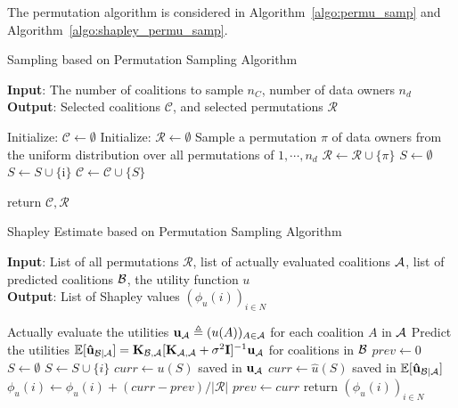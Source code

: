 The permutation algorithm is considered in Algorithm~\ref{algo:permu_samp} and Algorithm~\ref{algo:shapley_permu_samp}. 

\begin{algorithm}[ht]
\caption{Sampling based on Permutation Sampling Algorithm}\label{algo:permu_samp}
\begin{flushleft}
\textbf{Input}: The number of coalitions to sample $n_C$, number of data owners $n_d$\\
\textbf{Output}: Selected coalitions $\mathcal{C}$, and selected permutations $\mathcal{R}$
\end{flushleft}
\begin{algorithmic}[1]
    \STATE Initialize: $\mathcal{C} \gets \emptyset$
    \STATE Initialize: $\mathcal{R} \gets \emptyset$
        \STATE Sample a permutation $\pi$ of data owners from the uniform distribution over all permutations of $1, \cdots, n_d$
        \STATE $\mathcal{R} \gets \mathcal{R} \cup \{\pi\}$
        \STATE $S \gets \emptyset$
            \STATE $S \gets S \cup \{\text{i}\}$
            \STATE $\mathcal{C} \gets \mathcal{C} \cup \{S\}$  
        \ENDFOR
    \ENDWHILE

\STATE return $\mathcal{C}, \mathcal{R}$
\end{algorithmic}
\end{algorithm}

\begin{algorithm}[ht]
\caption{Shapley Estimate based on Permutation Sampling Algorithm}\label{algo:shapley_permu_samp}
\begin{flushleft}
\textbf{Input}: List of all permutations $\mathcal{R}$, list of actually evaluated coalitions $\mathcal{A}$, list of predicted coalitions $\mathcal{B}$, the utility function $u$\\
\textbf{Output}: List of Shapley values $(\phi_u(i))_{i \in N}$
\end{flushleft}
\begin{algorithmic}[1]
    \STATE Actually evaluate the utilities $\mathbf{u}_{\mathcal{A}} \triangleq (u(A))_{A \in \mathcal{A}}$ for each coalition $A$ in $\mathcal{A}$
    \STATE Predict the utilities $ \mathbb{E}[\mathbf{\hat{u}}_{\mathcal{B}|\mathcal{A}}] =
  \mathbf{K}_{\mathcal{B},\mathcal{A}} [\mathbf{K}_{\mathcal{A},\mathcal{A}} + \sigma^2 \mathbf{I}]^{-1} \mathbf{u}_{\mathcal{A}} $ for coalitions in $\mathcal{B}$
        \STATE $prev \gets 0$
        \STATE $S \gets \emptyset$ %
            \STATE $S \gets S \cup \{i\}$ %
            \STATE $curr \gets u(S)$ saved in $\mathbf{u}_{\mathcal{A}}$ 
            \STATE $curr \gets \hat{u}(S)$ saved in $ \mathbb{E}[\mathbf{\hat{u}}_{\mathcal{B}|\mathcal{A}}]$
            \ENDIF
            \STATE $\phi_{u}(i) \gets \phi_{u}(i) + (curr - prev) / |\mathcal{R}|$
            \STATE $prev \gets curr$
        \ENDFOR
    \ENDFOR
\STATE return $(\phi_u(i))_{i \in N}$
\end{algorithmic}
\end{algorithm}

